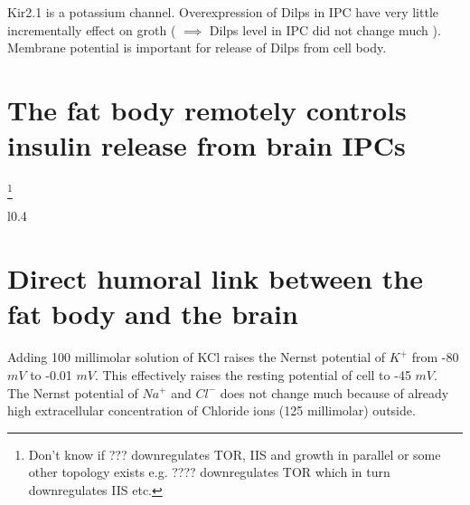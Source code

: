 \documentclass[twoside]{article}
\begin{document}
Kir2.1 is a potassium channel. Overexpression of Dilps in IPC have very little
incrementally effect on groth ( $\implies$ Dilps level in IPC did not change
much ). Membrane potential is important for release of Dilps from cell body.  

\section{The fat body remotely controls insulin release from brain IPCs}


\footnote{ Don't know if ??? downregulates TOR, IIS and growth in parallel or
    some other topology exists e.g. ???? downregulates TOR which in turn
    downregulates IIS etc. }

\begin{wrapfigure}{l}{0.4\textwidth}
\begin{center}

\end{center}
\caption{}
\label{fig:}
\end{wrapfigure}

\section{Direct humoral link between the fat body and the brain}

Adding 100 millimolar solution of KCl raises the Nernst potential of $K^+$ from
-80 $mV$ to -0.01 $mV$. This effectively raises the resting potential of cell to
-45 $mV$. The Nernst potential of $Na^+$ and $Cl^-$ does not change much because
of already high extracellular concentration of Chloride ions (125 millimolar)
outside. 
\end{document}
